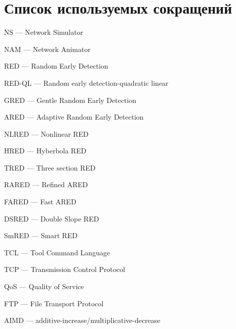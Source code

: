 \chapter*{Список используемых сокращений}

\mbox{}

NS --- Network Simulator

NAM --- Network Animator

RED --- Random Early Detection

RED-QL --- Random early detection-quadratic linear

GRED --- Gentle Random Early Detection

ARED --- Adaptive Random Early Detection

NLRED --- Nonlinear RED

HRED --- Hyberbola RED

TRED --- Three section RED

RARED --- Refined ARED

FARED --- Fast ARED

DSRED --- Double Slope RED

SmRED --- Smart RED

TCL --- Tool Command Language

TCP --- Transmission Control Protocol

QoS --- Quality of Service

FTP --- File Transport Protocol

AIMD --- additive-increase/multiplicative-decrease
